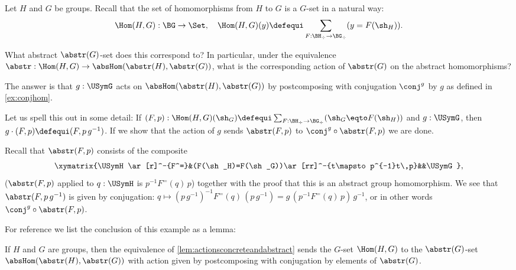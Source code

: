 \begin{example}
  \label{ex:abstrandconj}
  Let $H$ and $G$ be groups.  Recall that the set of homomorphisms from $H$ to $G$ is a $G$-set in a natural way:
$$\Hom(H,G):\BG\to\Set,\quad \Hom(H,G)(y)\defequi \sum_{F:\BH_\div\to \BG_\div}(y=F(\sh_H)).$$

What abstract $\abstr(G)$-set does this correspond to?
In particular, under the equivalence $\abstr:\Hom(H,G)\to\absHom(\abstr(H),\abstr(G))$, what is the corresponding action of $\abstr(G)$ on the abstract homomorphisms?

The answer is that $g:\USymG$ acts on $\absHom(\abstr(H),\abstr(G))$ by postcomposing with conjugation $\conj^g$ by $g$ as defined in \cref{ex:conjhom}.

Let us spell this out in some detail:
If $(F,p):\Hom(H,G)(\sh_G)\defequi
 \sum_{F:\BH_\div\to \BG_\div}(\sh_G\eqto F(\sh_H))$ and $g:\USymG$, then $g\cdot(F,p)\defequi(F,p\,g^{-1})$.  If we show that the action of $g$ sends $\abstr(F,p)$ to $\conj^g\circ\abstr(F,p)$ we are done.

Recall that $\abstr(F,p)$ consists of the composite
$$\xymatrix{\USymH\ar[r]^-{F^=}&(F(\sh_H)=F(\sh_G))\ar[rr]^-{t\mapsto p^{-1}t\,p}&&\USymG},$$
(\ie $\abstr(F,p)$ applied to $q:\USymH $ is  $p^{-1}F^=(q)\,p$)  together with the proof that this is an abstract group homomorphism.
We see that $\abstr(F,p\,g^{-1})$ is given by conjugation:
$q\mapsto(p\,g^{-1})^{-1}F^=(q)\,(p\,g^{-1})=g\,(p^{-1}F^=(q)\,p)\,g^{-1}$, or in other words $\conj^g\circ\abstr(F,p)$.
\end{example}
For reference we list the conclusion of this example as a lemma:
\begin{lemma}\label{lem:abstrandconj}
  If $H$ and $G$ are groups, then the equivalence of \cref{lem:actionsconcreteandabstract} sends the $G$-set $\Hom(H,G)$ to the $\abstr(G)$-set $\absHom(\abstr(H),\abstr(G))$ with action given by postcomposing with conjugation by elements of $\abstr(G)$.
\end{lemma}

